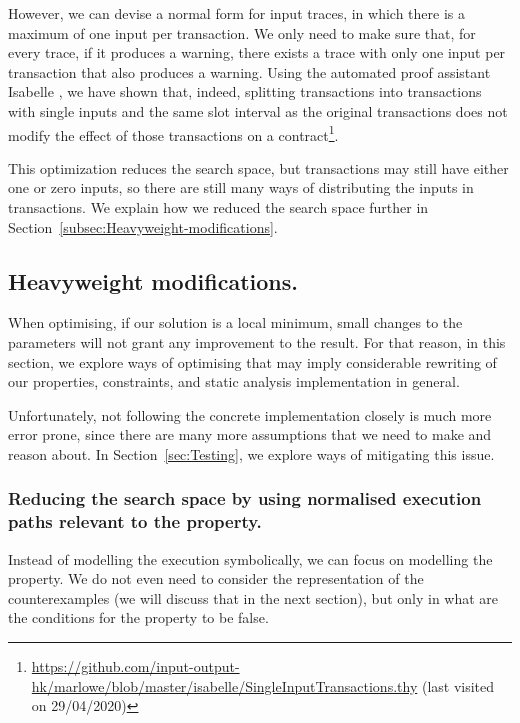 \documentclass[english,runningheads]{llncs}
\begin{document}
However, we can devise a normal form for input traces, in which there
is a maximum of one input per transaction. We only need to make sure
that, for every trace, if it produces a warning, there exists a trace
with only one input per transaction that also produces a warning.
Using the automated proof assistant Isabelle \cite{nipkow2002isabelle},
we have shown that, indeed, splitting transactions into transactions
with single inputs and the same slot interval as the original transactions
does not modify the effect of those transactions on a contract\footnote{\url{https://github.com/input-output-hk/marlowe/blob/master/isabelle/SingleInputTransactions.thy}
(last visited on 29/04/2020)}.

This optimization reduces the search space, but transactions may still
have either one or zero inputs, so there are still many ways of distributing
the inputs in transactions. We explain how we reduced
the search space further in Section~\ref{subsec:Heavyweight-modifications}. 

\subsection{Heavyweight modifications. \label{subsec:Heavyweight-modifications}}

When optimising, if our solution is a local minimum, small changes
to the parameters will not grant any improvement to the result.
For that reason, in this section, we explore ways of optimising that
may imply considerable rewriting of our properties, constraints, and
static analysis implementation in general.

Unfortunately, not following the concrete implementation closely is
much more error prone, since there are many
more assumptions that we need to make and reason about.
In Section~\ref{sec:Testing}, we explore ways of mitigating this issue.

\subsubsection{Reducing the search space by using normalised execution paths relevant
to the property. \label{subsec:Reducing-search-space-by-using-normalised-execution-paths-relevant-to-the-property}}

Instead of modelling the execution symbolically, we can focus on modelling
the property. We do not even need to consider the
representation of the counterexamples (we will discuss that in the next section),
but only in what are the conditions for the property to be false.
\end{document}
